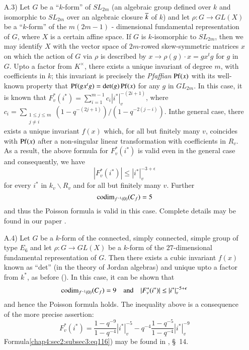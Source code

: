\begin{itemize}
\item[A.3)] Let $G$ be a ``$k$-form'' of $SL_{2m}$ (\ie an algebraic
  group defined over $k$ and isomorphic to $SL_{2m}$ over an algebraic
  closure $\overline{k}$ of $k$) and let $\rho:G\to GL(X)$ be a ``$k$-form''
  of the $m(2m-1)$ -  dimensional fundamental representation of $G$,
  where $X$ is a certain affine space. If $G$ is $k$-isomorphic to
  $SL_{2m}$, then we may identify $X$ with the vector space of
  $2m$-rowed skew-symmetric matrices $x$ on which the action of $G$
  via $\rho$ is described by $x\to \rho(g)\cdot x=g x^{t}g$ for
  $g$ in $G$. Upto a factor from $K^{\times}$, there exists a unique
  invariant of degree $m$, with coefficients in $k$; this invariant is
  precisely the {\em Pfaffian} $\operatorname{Pf}(x)$ with its well-known property
  that $\operatorname{Pf}(g x^{t}g)=\det(g)\operatorname{Pf}(x)$ for any $g$ in
  $GL_{2m}$. In this case, it is known that
  $F^{\ast}_{v}(i^{\ast})=\sum\limits^{m-1}_{i=1}c_{i}|i^{\ast}|^{-(2i+1)}_{v}$,
  where $c_{i}=\sum\limits_{\substack{1\leq j\leq m\\ j\neq
      i}}(1-q^{-(2j+1)})/(1-q^{-2(j-i)})$. In\pageoriginale the
  general case, there exists a unique invariant $f(x)$ which, for all
  but finitely many $v$, coincides with $\operatorname{Pf}(x)$ after a non-singular
  linear transformation with coefficients in $R_{v}$. As a result, the
  above formula for $F^{\ast}_{v}(i^{\ast})$ is valid even in the
  general case and consequently, we have
  $$
  |F^{\ast}_{v}(i^{\ast})|\leq |i^{\ast}|_{v}^{-3+\epsilon}
  $$
  for every $i^{\ast}$ in $k_{v}\backslash R_{v}$ and for all but
  finitely many $v$. Further 
  $$
  \operatorname{codim}_{f^{-1}(0)}(C_{f})=5
  $$
  and thus the Poisson formula is valid in this case. Complete details
  may be found in our paper \cite{Igu 1}.
  
\item[A.4)] Let $G$ be a $k$-form of the connected, simply connected,
  simple group of type $E_{6}$ and let $\rho:G\to GL(X)$ be a $k$-form
  of the $27$-dimensional fundamental representation of $G$. Then
  there exists a cubic invariant $f(x)$ known as ``det'' (in the
  theory of Jordan algebras) and unique upto a factor from $k^{\ast}$,
  as before (\cite{Jac}). In this case, it can be shown that
  $$
  \operatorname{codim}_{f^{-1}(0)}(C_{f})=9\quad\text{and}\quad
  |F^{\ast}_{v}(i^{\ast})|\leq |i^{\ast}|^{-5+\epsilon}_{v}
  $$
  and hence the Poisson formula holds. The inequality above is a
  consequence of the more precise assertion:
  \begin{equation*}
    F^{\ast}_{v}(i^{\ast})=\frac{1-q^{-9}}{1-q^{-4}}|i^{\ast}|^{-5}_{v}-
    q^{-4}\frac{1-q^{-5}}{1-q^{-4}}|i^{\ast}|^{-9}_{v}
    \tag{116}\label{chap4:sec2:subsec3:eq116} 
  \end{equation*}
  Formula\pageoriginale \ref{chap4:sec2:subsec3:eq116}) may be found
  in \cite{Mar}, \S\ 14. 


\end{itemize}
